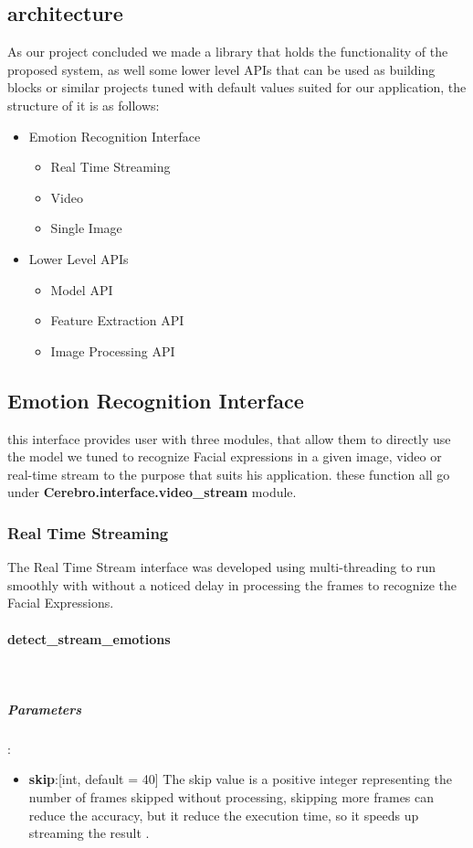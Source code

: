 \subsection{architecture}
As our project concluded we made a library that holds the functionality of the proposed system, as well some lower level APIs that can be used as building blocks or similar projects tuned with default values suited for our application, the structure of it is as follows:
\begin{itemize}
	\item Emotion Recognition Interface 
	\begin{itemize}
		\item Real Time Streaming
		\item Video
		\item Single Image
	\end{itemize}
	\item Lower Level APIs
	\begin{itemize}
		\item Model API
		\item Feature Extraction API
		\item Image Processing API
	\end{itemize}
\end{itemize}

\subsection{Emotion Recognition Interface}
this interface provides user with three modules, that allow them to directly use the model we tuned to recognize Facial expressions in a given image, video or real-time stream to the purpose that suits his application.\newline
these function all go under \textbf{Cerebro.interface.video\_stream} module.

\subsubsection{Real Time Streaming}
The Real Time Stream interface was developed using multi-threading to run smoothly with without a noticed delay in processing the frames to recognize the Facial Expressions. 
\bigbreak 

\paragraph{detect\_stream\_emotions} \mbox{} \\
\subparagraph{Parameters}:
\begin{changemargin}{0.5cm}{0cm} 
	\begin{itemize}
		\item\textbf{skip}:[int, default = 40] The skip value is a positive integer representing the number of frames skipped without processing, skipping more frames can reduce the accuracy, but it reduce the execution time, so it speeds up streaming the result .
	\end{itemize}
\end{changemargin}

